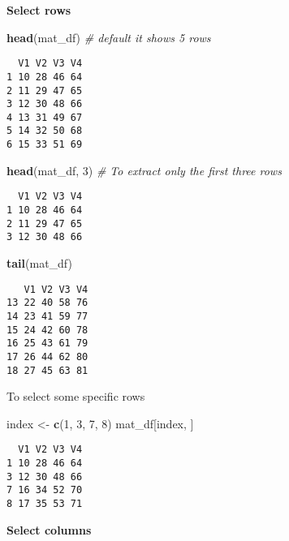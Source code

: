 \documentclass[
]{book}
\newenvironment{Shaded}{\begin{snugshade}}{\end{snugshade}}
\newcommand{\CommentTok}[1]{\textcolor[rgb]{0.56,0.35,0.01}{\textit{#1}}}
\newcommand{\DecValTok}[1]{\textcolor[rgb]{0.00,0.00,0.81}{#1}}
\newcommand{\KeywordTok}[1]{\textcolor[rgb]{0.13,0.29,0.53}{\textbf{#1}}}
\newcommand{\NormalTok}[1]{#1}
\newcommand{\StringTok}[1]{\textcolor[rgb]{0.31,0.60,0.02}{#1}}
\begin{document}
\textbf{Select rows}

\begin{Shaded}
\begin{Highlighting}[]
\KeywordTok{head}\NormalTok{(mat_df) }\CommentTok{# default it shows 5 rows}
\end{Highlighting}
\end{Shaded}

\begin{verbatim}
  V1 V2 V3 V4
1 10 28 46 64
2 11 29 47 65
3 12 30 48 66
4 13 31 49 67
5 14 32 50 68
6 15 33 51 69
\end{verbatim}

\begin{Shaded}
\begin{Highlighting}[]
\KeywordTok{head}\NormalTok{(mat_df, }\DecValTok{3}\NormalTok{) }\CommentTok{# To extract only the first three rows }
\end{Highlighting}
\end{Shaded}

\begin{verbatim}
  V1 V2 V3 V4
1 10 28 46 64
2 11 29 47 65
3 12 30 48 66
\end{verbatim}

\begin{Shaded}
\begin{Highlighting}[]
\KeywordTok{tail}\NormalTok{(mat_df)}
\end{Highlighting}
\end{Shaded}

\begin{verbatim}
   V1 V2 V3 V4
13 22 40 58 76
14 23 41 59 77
15 24 42 60 78
16 25 43 61 79
17 26 44 62 80
18 27 45 63 81
\end{verbatim}

To select some specific rows

\begin{Shaded}
\begin{Highlighting}[]
\NormalTok{index <-}\StringTok{ }\KeywordTok{c}\NormalTok{(}\DecValTok{1}\NormalTok{, }\DecValTok{3}\NormalTok{, }\DecValTok{7}\NormalTok{, }\DecValTok{8}\NormalTok{)}
\NormalTok{mat_df[index, ]}
\end{Highlighting}
\end{Shaded}

\begin{verbatim}
  V1 V2 V3 V4
1 10 28 46 64
3 12 30 48 66
7 16 34 52 70
8 17 35 53 71
\end{verbatim}

\textbf{Select columns}
\end{document}
